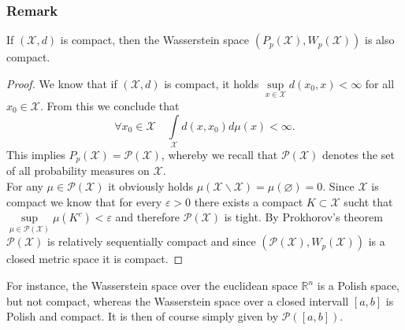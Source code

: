 \documentclass[11pt,a4paper]{article}
\begin{document}
\subsubsection{Remark}
If $(\mathcal{X},d)$ is compact, then the Wasserstein space $(P_p(\mathcal{X}),W_p(\mathcal{X}))$ is also compact.
\begin{proof}
We know that if $(\mathcal{X},d)$ is compact, it holds $\sup\limits_{x\in\mathcal{X}}d(x_0,x)<\infty$ for all $x_0\in\mathcal{X}$. From this we conclude that 
\[
\forall x_0\in\mathcal{X}\quad\int\limits_{\mathcal{X}}d(x,x_0)d\mu(x)<\infty.
\]
This implies $P_p(\mathcal{X})=\mathcal{P(X)}$, whereby we recall that $\mathcal{P(X)}$ denotes the set of all probability measures on $\mathcal{X}$.\vspace{1em}\\
For any $\mu\in\mathcal{P(X)}$ it obviously holds $\mu(\mathcal{X}\backslash\mathcal{X})=\mu(\varnothing)=0$. Since $\mathcal{X}$ is compact we know that for every $\varepsilon>0$ there exists a compact $K\subset\mathcal{X}$ sucht that $\sup\limits_{\mu\in\mathcal{P(X)}}\mu(K^c)<\varepsilon$ and therefore $\mathcal{P(X)}$ is tight. By Prokhorov's theorem $\mathcal{P(X)}$ is relatively sequentially compact and since $(\mathcal{P(X)},W_p(\mathcal{X}))$ is a closed metric space it is compact. 
\end{proof}
\noindent{}For instance, the Wasserstein space over the euclidean space $\mathbb{R}^n$ is a Polish space, but not compact, whereas the Wasserstein space over a closed intervall $[a,b]$ is Polish and compact. It is then of course simply given by $\mathcal{P}([a,b])$.
\end{document}
